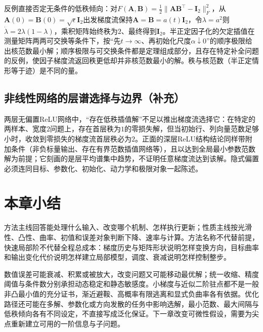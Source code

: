 反例直接否定无条件的低秩倾向：对$F(\bm A,\bm B)=\frac12\|\bm A\bm B^\top-\bm I_2\|_F^2$，从$\bm A(0)=\bm B(0)=\sqrt\epsilon\bm I_2$出发梯度流保持$\bm A=\bm B=a(t)\bm I_2$，令$\lambda=a^2$则$\dot\lambda=2\lambda(1-\lambda)$，乘积矩阵始终秩为$2$、最终得到$\bm I_2$。半正定因子化的欠定插值在测量矩阵两两可交换等条件下，按“先$t\to\infty$、再初始化尺度$\alpha\downarrow0$”的顺序极限给出核范数最小解；顺序极限与可交换条件都是定理组成部分，且存在特定补全问题的反例，使因子梯度流返回秩更低却并非核范数最小的解。秩与核范数（半正定情形等于迹）是不同的量。

\subsection{非线性网络的层谱选择与边界（补充）}

两层无偏置ReLU网络中，“存在低秩插值解”不足以推出梯度流选择它：在特定的两样本、宽度$2$问题上，存在首层秩为$1$的零损失解，但当初始行、列向量范数足够小时，收敛到零损失的梯度流首层秩必为$2$。正面的深层ReLU结构结论同样带附加条件（非负标量输出、存在有界范数插值网络等），且以达到全局最小参数范数解为前提；它刻画的是层平均谱集中趋势，不证明任意梯度流达到该解。隐式偏置必须连同目标、参数化、初始化、动力学和极限对象一起陈述。

\section{本章小结}

方法主线回答能处理什么输入、改变哪个机制、怎样执行更新；性质主线按光滑性、凸性、曲率、初值和误差对象判断下降、速率与计算。方法名称不代替前提，快速局部阶不代替全程总成本：梯度历史与矩阵形状说明怎样变换方向，目标曲率和输出变化代价说明怎样建立局部模型，调度、衰减说明怎样控制整步。

数值误差可能衰减、积累或被放大，改变问题又可能移动最优解；统一收缩、精度阈值与条件数分别承担动态稳定和静态敏感度。小梯度与近似二阶驻点都不是一般非凸最小值的充分证书，渐近避鞍、高概率有限逃离和显式负曲率各有依据。优化路径还可能在多解、参数化或方向发散的任务中影响选解，最小范数、最大间隔与低秩倾向各有不同设定，不直接写成泛化保证。下一章改变可微性假设，需要为尖点重新建立可用的一阶信息与子问题。
